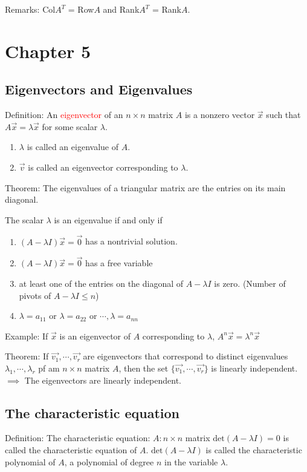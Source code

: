 \documentclass[12pt]{article}
\begin{document}
Remarks: Col$A^T$ = Row$A$ and Rank$A^T$ = Rank$A$.


\section{Chapter 5}
\subsection{Eigenvectors and Eigenvalues}
Definition: An \textcolor{red}{eigenvector} of an $n\times n$ matrix $A$ is a nonzero vector $\vec{x}$ such that $A\vec{x} = \lambda\vec{x}$ for some scalar $\lambda$. 
\begin{enumerate}
    \item $\lambda$ is called an eigenvalue of $A$.
    \item $\vec{v}$ is called an eigenvector corresponding to $\lambda$.
\end{enumerate}

Theorem: The eigenvalues of a triangular matrix are the entries on its main diagonal.

The scalar $\lambda$ is an eigenvalue if and only if 
\begin{enumerate}
    \item $(A-\lambda I)\vec{x} = \vec{0}$ has a nontrivial solution.
    \item $(A-\lambda I)\vec{x} = \vec{0}$ has a free variable
    \item at least one of the entries on the diagonal of $A-\lambda I$ is zero. (Number of pivots of $A - \lambda I \leq n$)
    \item $\lambda = a_{11}$ or $\lambda = a_{22}$ or $\cdots, \lambda = a_{nn}$
\end{enumerate}

Example: If $\vec{x}$ is an eigenvector of $A$ corresponding to $\lambda$, $A^n\vec{x} = \lambda^n\vec{x}$

Theorem: If $\vec{v_1}, \cdots, \vec{v_r}$ are eigenvectors that correspond to distinct eigenvalues $\lambda_1, \cdots, \lambda_r$ pf am $n\times n$ matrix $A$, then the set $\{\vec{v_1}, \cdots, \vec{v_r}\}$ is linearly independent.$ \implies $ The eigenvectors are linearly independent.


\subsection{The characteristic equation}
Definition: The characteristic equation: $A: n\times n$ matrix $\text{det}(A-\lambda I) = 0$ is called the characteristic equation of $A$. $\text{det}(A-\lambda I)$ is called the characteristic polynomial of $A$, a polynomial of degree $n$ in the variable $\lambda$.
\end{document}
